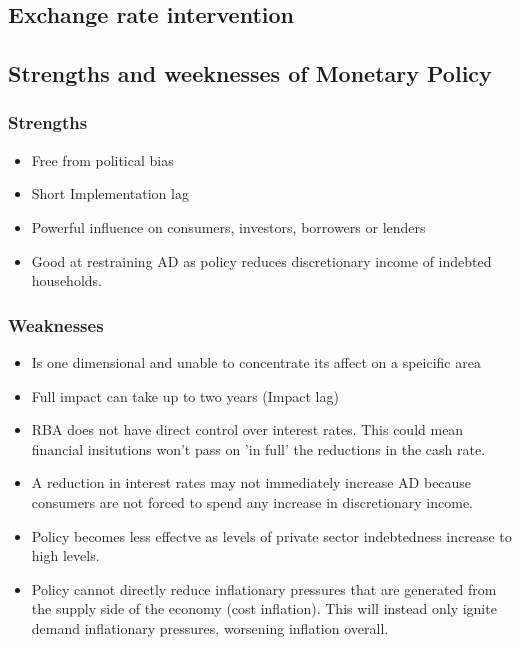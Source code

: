 \documentclass[11pt]{article}
\begin{document}
\subsection{Exchange rate intervention}
\label{sec-3-9}



\subsection{Strengths and weeknesses of Monetary Policy}
\label{sec-3-10}

\subsubsection{Strengths}
\label{sec-3-10-1}

\begin{itemize}
\item Free from political bias
\item Short Implementation lag
\item Powerful influence on consumers, investors, borrowers or lenders
\item Good at restraining AD as policy reduces discretionary income of
indebted households.
\end{itemize}

\subsubsection{Weaknesses}
\label{sec-3-10-2}

\begin{itemize}
\item Is one dimensional and unable to concentrate its affect on a speicific area
\item Full impact can take up to two years (Impact lag)
\item RBA does not have direct control over interest rates. This could
mean financial insitutions won't pass on 'in full' the reductions in
the cash rate.
\item A reduction in interest rates may not immediately increase AD
because consumers are not forced to spend any increase in
discretionary income.
\item Policy becomes less effectve as levels of private sector
indebtedness increase to high levels.
\item Policy cannot directly reduce inflationary pressures that are
generated from the supply side of the economy (cost inflation). This
will instead only ignite demand inflationary pressures, worsening
inflation overall.
\end{itemize}
\end{document}

